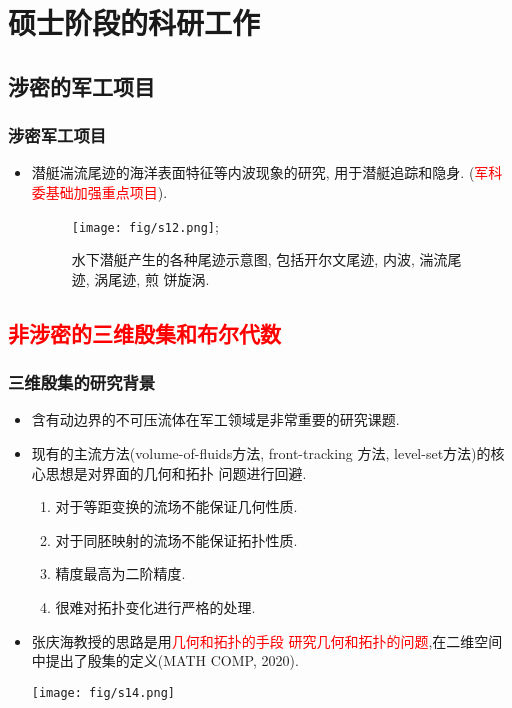 \documentclass[UTF8]{ctexbeamer}	%
\theoremstyle{plain}
\theoremstyle{definition}
\theoremstyle{remark}
\numberwithin{equation}{section}
\begin{document}
\section{硕士阶段的科研工作}
\subsection{涉密的军工项目}
\begin{frame}
    \frametitle{涉密军工项目}
    \begin{itemize}
        \item 潜艇湍流尾迹的海洋表面特征等内波现象的研究, 用于潜艇追踪和隐身.
        (\textcolor{red}{军科委基础加强重点项目}).
        \begin{figure}
            \texttt{[image: fig/s12.png]};
            \caption{水下潜艇产生的各种尾迹示意图, 包括开尔文尾迹, 内波, 湍流尾迹, 涡尾迹, 煎
            饼旋涡.}
        \end{figure}
    \end{itemize}
\end{frame}

\subsection{\textcolor{red}{非涉密的三维殷集和布尔代数}}
\begin{frame}
    \frametitle{三维殷集的研究背景}
    \begin{itemize}
        \item 含有动边界的不可压流体在军工领域是非常重要的研究课题.
        \item 现有的主流方法(volume-of-fluids方法, front-tracking
        方法, level-set方法)的核心思想是对界面的几何和拓扑
        问题进行回避.
        \begin{enumerate}
            \item 对于等距变换的流场不能保证几何性质.
            \item 对于同胚映射的流场不能保证拓扑性质.
            \item 精度最高为二阶精度.
            \item 很难对拓扑变化进行严格的处理.
        \end{enumerate}
        \item 张庆海教授的思路是用\textcolor{red}{几何和拓扑的手段
        研究几何和拓扑的问题},在二维空间中提出了殷集的定义(MATH COMP, 2020).
        \begin{center}
            \texttt{[image: fig/s14.png]}
        \end{center}
    \end{itemize}
\end{frame}
\end{document}
